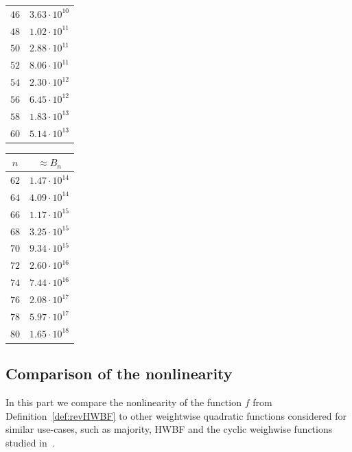 \documentclass[11pt]{llncs}
\begin{document}
\begin{table}
\begin{minipage}{0.24\textwidth}
\begin{tabular}{|c|c|}
			$46$ & $3.63 \cdot 10^{10}$ \\
			$48$ & $1.02 \cdot 10^{11}$ \\
			$50$ & $2.88 \cdot 10^{11}$ \\
			$52$ & $8.06 \cdot 10^{11}$ \\
			$54$ & $2.30 \cdot 10^{12}$ \\
			$56$ & $6.45 \cdot 10^{12}$ \\
			$58$ & $1.83 \cdot 10^{13}$ \\
			$60$ & $5.14 \cdot 10^{13}$ \\
			\hline
		\end{tabular}
	\end{minipage}%
	\begin{minipage}{0.24\textwidth}
		\centering
		\begin{tabular}{|c|c|}
			\hline
			$n$ & $\approx B_n$ \\
			\hline
			$62$ & $1.47 \cdot 10^{14}$ \\
			$64$ & $4.09 \cdot 10^{14}$ \\
			$66$ & $1.17 \cdot 10^{15}$ \\
			$68$ & $3.25 \cdot 10^{15}$ \\
			$70$ & $9.34 \cdot 10^{15}$ \\
			$72$ & $2.60 \cdot 10^{16}$ \\
			$74$ & $7.44 \cdot 10^{16}$ \\
			$76$ & $2.08 \cdot 10^{17}$ \\
			$78$ & $5.97 \cdot 10^{17}$ \\
			$80$ & $1.65 \cdot 10^{18}$ \\
			\hline
		\end{tabular}
	\end{minipage}
	\label{table:walsh_bounds}
\end{table}



\subsection{Comparison of the nonlinearity}


In this part we compare the nonlinearity of the function $f$ from Definition~\ref{def:revHWBF} to other weightwise quadratic functions considered for similar use-cases, such as majority, HWBF and the cyclic weighwise functions studied in~\cite{DAM:MeaOza24}. 
\end{document}
